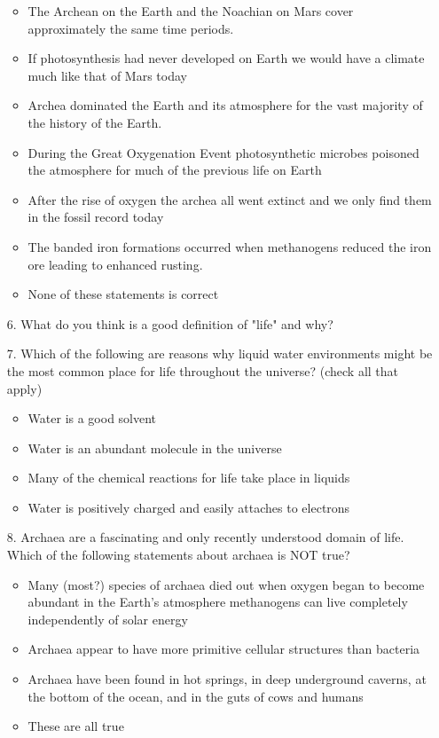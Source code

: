 \begin{enumerate}
\begin{itemize}[label={$\bullet$}]
    \item The Archean on the Earth and the Noachian on Mars cover approximately the same time periods.
    \item If photosynthesis had never developed on Earth we would have a climate much like that of Mars today
    \item Archea dominated the Earth and its atmosphere for the vast majority of the history of the Earth.
    \item During the Great Oxygenation Event photosynthetic microbes poisoned the atmosphere for much of the previous life on Earth
    \item After the rise of oxygen the archea all went extinct and we only find them in the fossil record today
    \item The banded iron formations occurred when methanogens reduced the iron ore leading to enhanced rusting.
    \item None of these statements is correct
\end{itemize}

\item[6.] What do you think is a good definition of "life" and why?

\item[7.] Which of the following are reasons why liquid water environments might be the most common place for life throughout the universe? (check all that apply) 

\begin{itemize}[label={$\bullet$}]
    \item Water is a good solvent
    \item Water is an abundant molecule in the universe
    \item Many of the chemical reactions for life take place in liquids
    \item Water is positively charged and easily attaches to electrons
\end{itemize}

\item[8.] Archaea are a fascinating and only recently understood domain of life. Which of the following statements about archaea is NOT true?

\begin{itemize}[label={$\bullet$}]
    \item Many (most?) species of archaea died out when oxygen began to become abundant in the Earth's atmosphere methanogens can live completely independently of solar energy
    \item Archaea appear to have more primitive cellular structures than bacteria
    \item Archaea have been found in hot springs, in deep underground caverns, at the bottom of the ocean, and in the guts of cows and humans
    \item These are all true
\end{itemize}

\end{enumerate}

